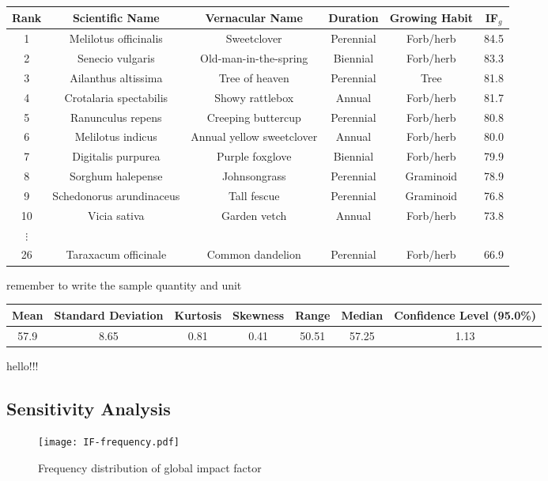 \documentclass[12pt]{article}
\begin{document}
		{
			\fontsize{10}{14}\selectfont
			{
				\begin{longtable}{cccccc}
					\toprule
					Rank&Scientific Name&Vernacular Name&Duration&Growing Habit&IF$_g$\\
					\toprule
					1&Melilotus officinalis&Sweetclover&Perennial&Forb/herb&84.5\\
					2&Senecio vulgaris&Old-man-in-the-spring&Biennial&Forb/herb&83.3\\
					3&Ailanthus altissima&Tree of heaven&Perennial&Tree&81.8\\
					4&Crotalaria spectabilis&Showy rattlebox&Annual&Forb/herb&81.7\\
					5&Ranunculus repens&Creeping buttercup&Perennial&Forb/herb&80.8\\
					6&Melilotus indicus&Annual yellow sweetclover&Annual&Forb/herb&80.0\\
					7&Digitalis purpurea&Purple foxglove&Biennial&Forb/herb&79.9\\
					8&Sorghum halepense&Johnsongrass&Perennial&Graminoid&78.9\\
					9&Schedonorus arundinaceus&Tall fescue&Perennial&Graminoid&76.8\\
					10&Vicia sativa&Garden vetch&Annual&Forb/herb&73.8\\
					$\vdots$\\
					26&Taraxacum officinale&Common dandelion&Perennial&Forb/herb&66.9\\
					\bottomrule
				\end{longtable}
			}
		}
		
		remember to write the sample quantity and unit \\

		{
			\fontsize{10}{14}\selectfont
			{
				\begin{longtable}{ccccccc}
					\toprule
					Mean&Standard Deviation&Kurtosis&Skewness&Range&Median&Confidence Level (95.0\%)\\
					\toprule
					57.9&8.65&0.81&0.41&50.51&57.25&1.13\\
					\bottomrule
				\end{longtable}
			}
		}
		
		hello!!! \\

	\subsection{Sensitivity Analysis}
	
		\begin{figure}
			\centering
			\texttt{[image: IF-frequency.pdf]}
			\caption{Frequency distribution of global impact factor}
			\label{fig:freqIF}
		\end{figure}
	
\end{document}
